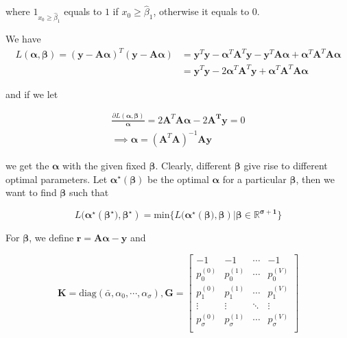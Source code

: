 where $1_{x_{0} \geq \hat{\beta}_{1}}$ equals to $1$ if ${x_{0} \geq \hat{\beta}_{1}}$, otherwise it equals to $0$.

We have
\begin{equation}
 \begin{split}
	L(\boldsymbol{\alpha},\boldsymbol{\beta}) 
	 =(\boldsymbol{y-A\alpha})^T(\boldsymbol{y-A\alpha}) 
	&=\boldsymbol{y}^T\boldsymbol{y}-\boldsymbol{\alpha}{^T}\boldsymbol{A}^T\boldsymbol{y}-\boldsymbol{y}^T\boldsymbol{A\alpha}+\boldsymbol{\alpha}^T\boldsymbol{A}^T\boldsymbol{A\alpha} \\
	& = \boldsymbol{y}^T\boldsymbol{y}-2\boldsymbol{\alpha}^T\boldsymbol{A}^T\boldsymbol{y}+\boldsymbol{\alpha}^T\boldsymbol{A}^T\boldsymbol{A}\boldsymbol{\alpha}
\end{split}
\end{equation}

and if we let 

\begin{equation}
\label{alpha_form}
	\begin{split}
		\frac{\partial L(\boldsymbol{\alpha}, \boldsymbol{\beta})}{\boldsymbol{\alpha}}=2\boldsymbol{A}^T\boldsymbol{A}\boldsymbol{\alpha}-2\boldsymbol{A^T}\boldsymbol{y}=0 \\ \implies 
		\boldsymbol{\alpha}=(\boldsymbol{A}^T\boldsymbol{A})^{-1}\boldsymbol{A}\boldsymbol{y}
	\end{split}
\end{equation}


we get the $\boldsymbol{\alpha}$ with the given fixed $\boldsymbol{\beta}$. Clearly, different $\boldsymbol{\beta}$ give rise to different optimal parameters. Let $\boldsymbol{\alpha^\star}(\boldsymbol{\beta})$ be the optimal $\boldsymbol{\alpha}$ for a particular $\boldsymbol{\beta}$, then we want to find $\boldsymbol{\beta}$ such that


\begin{equation}
	L(\boldsymbol{\alpha^\star}(\boldsymbol{\beta^\star)}, \boldsymbol{\beta^\star})=\text{min}\{L(\boldsymbol{\alpha^\star}(\boldsymbol{\beta)}, \boldsymbol{\beta}) | \boldsymbol{\beta\in\mathbb{R}^{\sigma+1}}\}
\end{equation}

For $\boldsymbol{\beta}$, we define $\boldsymbol{r}=\boldsymbol{A\alpha-y}$ and 

$$
\boldsymbol{K}=\text{diag}(\bar{\alpha},\alpha_0, \cdots, \alpha_\sigma), \boldsymbol{G}=\begin{bmatrix}
 -1 & -1 & \cdots & -1 \\
  p_0^{(0)} & p_0^{(1)} & \cdots & p_0^{(V)} \\
  p_1^{(0)} & p_1^{(1)} & \cdots & p_1^{(V)} \\
  \vdots & \vdots & \ddots & \vdots \\
  p_\sigma^{(0)} & p_\sigma^{(1)}& \cdots & p_\sigma^{(V)} \\
\end{bmatrix}
$$

